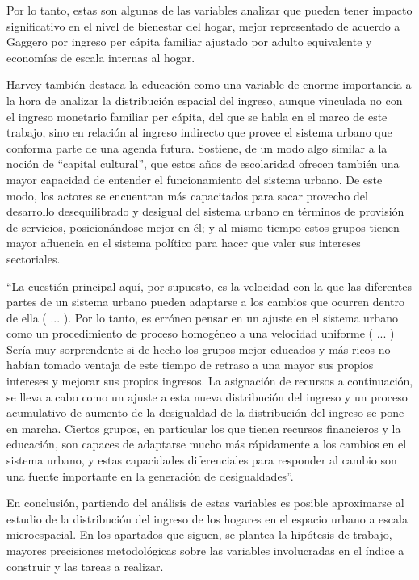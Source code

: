 Por lo tanto, estas son algunas de las variables analizar que pueden tener impacto significativo en el nivel de bienestar del hogar, mejor representado de acuerdo a Gaggero \cite{gaggero} por ingreso per cápita familiar ajustado por adulto equivalente y economías de escala internas al hogar.
	
Harvey también destaca la educación como una variable de enorme importancia a la hora de analizar la distribución espacial del ingreso, aunque vinculada no con el ingreso monetario familiar per cápita, del que se habla en el marco de este trabajo, sino en relación al ingreso indirecto que provee el sistema urbano que conforma parte de una agenda futura. Sostiene, de un modo algo similar a la noción de “capital cultural”, que estos años de escolaridad ofrecen también una mayor capacidad de entender el funcionamiento del sistema urbano. De este modo, los actores se encuentran más capacitados para sacar provecho del desarrollo desequilibrado y desigual del sistema urbano en términos de provisión de servicios, posicionándose mejor en él; y al mismo tiempo estos grupos tienen mayor afluencia en el sistema político para hacer que valer sus intereses sectoriales.
	
“La cuestión principal aquí, por supuesto, es la velocidad con la que las diferentes partes de un sistema urbano pueden adaptarse a los cambios que ocurren dentro de ella ( ... ). Por lo tanto, es erróneo pensar en un ajuste en el sistema urbano como un procedimiento de proceso homogéneo a una velocidad uniforme ( ... ) Sería muy sorprendente si de hecho los grupos mejor educados y más ricos no habían tomado ventaja de este tiempo de retraso a una mayor sus propios intereses y mejorar sus propios ingresos. La asignación de recursos a continuación, se lleva a cabo como un ajuste a esta nueva distribución del ingreso y un proceso acumulativo de aumento de la desigualdad de la distribución del ingreso se pone en marcha. Ciertos grupos, en particular los que tienen recursos financieros y la educación, son capaces de adaptarse mucho más rápidamente a los cambios en el sistema urbano, y estas capacidades diferenciales para responder al cambio son una fuente importante en la generación de desigualdades”\cite[~56]{harvey}.
	
En conclusión, partiendo del análisis de estas variables es posible aproximarse al estudio de la distribución del ingreso de los hogares en el espacio urbano a escala microespacial. En los apartados que siguen, se plantea la hipótesis de trabajo, mayores precisiones metodológicas sobre las variables involucradas en el índice a construir y las tareas a realizar.
	
